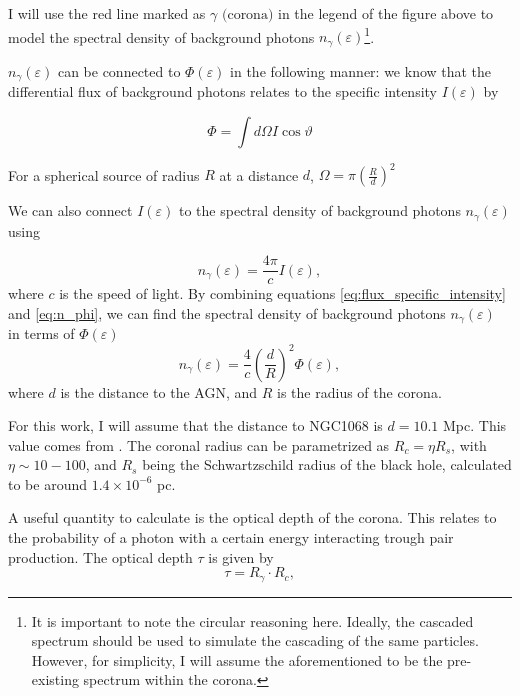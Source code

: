 I will use the red line marked as $\gamma \text{ (corona)}$ in the legend of the figure above to model the spectral density of background photons $n_{\gamma}(\varepsilon)$\footnote{It is important to note the circular reasoning here. Ideally, the cascaded spectrum should be used to simulate the cascading of the same particles. However, for simplicity, I will assume the aforementioned to be the pre-existing spectrum within the corona.}.

$n_{\gamma}(\varepsilon)$ can be connected to $\Phi(\varepsilon)$ in the following manner: we know that the differential flux of background photons relates to the specific intensity $I(\varepsilon)$ by

\begin{equation}
    \Phi = \int d\Omega I \cos \vartheta
    \label{eq:flux_specific_intensity}
\end{equation}

For a spherical source of radius $R$ at a distance $d$, $\Omega = \pi \left(\frac{R}{d}\right)^2$

We can also connect $I(\varepsilon)$ to the spectral density of background photons $n_{\gamma}(\varepsilon)$ using

\begin{equation}
    n_{\gamma}(\varepsilon) = \frac{4\pi}{c}I(\varepsilon),
    \label{eq:n_phi}
\end{equation} where $c$ is the speed of light. By combining equations \eqref{eq:flux_specific_intensity} and \eqref{eq:n_phi}, we can find the spectral density of background photons $n_{\gamma}(\varepsilon)$ in terms of $\Phi(\varepsilon)$
\begin{equation}
    n_{\gamma}(\varepsilon) = \frac{4}{c}\left(\frac{d}{R}\right)^2\Phi(\varepsilon),
    \label{eq:n_gamma}
\end{equation}
where $d$ is the distance to the AGN, and $R$ is the radius of the corona.

For this work, I will assume that the distance to NGC1068 is $d = 10.1$ Mpc. This value comes from \citet{padovani2024highenergyneutrinosvicinitysupermassive}. The coronal radius can be parametrized as $R_c = \eta R_s$, with $\eta \sim 10 - 100$, and $R_s$ being the Schwartzschild radius of the black hole, calculated to be around $1.4 \times 10^{-6}$ pc.

A useful quantity to calculate is the optical depth of the corona. This relates to the probability of a photon with a certain energy interacting trough pair production. The optical depth $\tau$ is given by 
\begin{equation*}
    \tau = R_{\gamma} \cdot  R_c,
\end{equation*}

